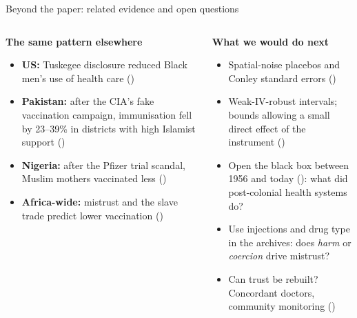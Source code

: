 \documentclass[aspectratio=1610]{beamer}
\newcommand{\refs}[1]{{\footnotesize\color{softgray}(\citealp{#1})}} %
\begin{document}
\begin{frame}{Beyond the paper: related evidence and open questions}
  \small
  \begin{columns}[T]
    \begin{column}{0.49\textwidth}
      \textbf{The same pattern elsewhere}
      \begin{itemize}
        \item \textbf{US:} Tuskegee disclosure reduced Black men's use of health care
          \refs{alsan_wanamaker_2018}
        \item \textbf{Pakistan:} after the CIA's fake vaccination campaign, immunisation fell by 23--39\%
          in districts with high Islamist support \refs{martinez_bravo_stegmann_2022}
        \item \textbf{Nigeria:} after the Pfizer trial scandal, Muslim mothers vaccinated less
          \refs{archibong_annan_2021}
        \item \textbf{Africa-wide:} mistrust and the slave trade predict lower vaccination
          \refs{stoop_etal_2021,athias_macina_2022}
      \end{itemize}
    \end{column}
    \begin{column}{0.49\textwidth}
      \textbf{What we would do next}
      \begin{itemize}
        \item Spatial-noise placebos and Conley standard errors \refs{kelly_2019}
        \item Weak-IV-robust intervals; bounds allowing a small direct effect of the instrument
          \refs{conley_etal_2012}
        \item Open the black box between 1956 and today \refs{austin_2008}:
          what did post-colonial health systems do?
        \item Use injections and drug type in the archives: does \emph{harm} or \emph{coercion} drive mistrust?
        \item Can trust be rebuilt? Concordant doctors, community monitoring
          \refs{alsan_garrick_graziani_2019,christensen_etal_2021}
      \end{itemize}
    \end{column}
  \end{columns}
\end{frame}
\end{document}
